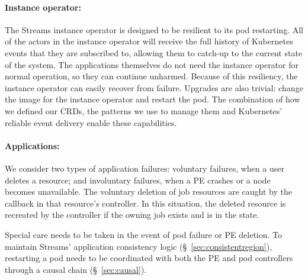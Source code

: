 \paragraph{Instance operator:} The Streams instance operator is designed to be
resilient to its pod restarting.  All of the actors in the instance operator
will receive the full history of Kubernetes events that they are subscribed to,
allowing them to catch-up to the current state of the system.  The applications
themselves do not need the instance operator for normal operation, so they can
continue unharmed. Because of this resiliency, the instance operator can easily
recover from failure. Upgrades are also trivial: change the image for the
instance operator and restart the pod. The combination of how we defined our
CRDs, the patterns we use to manage them and Kubernetes' reliable event delivery
enable these capabilities.

\paragraph{Applications:} We consider two types of application failures:
voluntary failures, when a user deletes a resource; and involuntary failures,
when a PE crashes or a node becomes unavailable. The voluntary deletion of job
resources are caught by the  callback in that resource's
controller. In this situation, the deleted resource is recreated
by the controller if the owning job exists and is in the  state.

Special care needs to be taken in the event of pod failure or PE deletion. To
maintain Streams' application consistency logic
(\S~\ref{sec:consistentregion}), restarting a pod needs to be coordinated with
both the PE and pod controllers through a causal chain (\S~\ref{sec:causal}). 
